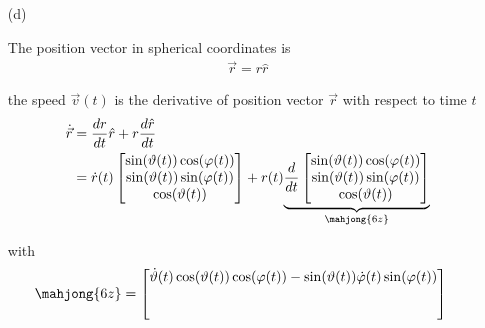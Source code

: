 \documentclass[11pt,a4paper]{article}
\begin{document}
\begin{enumerate}
\item[(d)]

The position vector in spherical coordinates is
\begin{align*}
\vec{r}=r\hat{r}
\end{align*}

the speed $\vec{v}(t)$ is the derivative of position vector $\vec{r}$ with respect to time $t$
\begin{align*}
\dot{\vec{r}}
&=\frac{dr}{dt}\hat{r}+r\frac{d\hat{r}}{dt} \\
&=
\dot{r}(t)
\begin{bmatrix}
\sin(\vartheta(t))\cos(\varphi(t)) \\
\sin(\vartheta(t))\sin(\varphi(t)) \\
\cos(\vartheta(t))
\end{bmatrix}
+
r(t)
\underset{\mahjong{6z}}{\underbrace{
\frac{d}{dt}
\begin{bmatrix}
\sin(\vartheta(t))\cos(\varphi(t)) \\
\sin(\vartheta(t))\sin(\varphi(t)) \\
\cos(\vartheta(t))
\end{bmatrix}
}} \\
\end{align*}

with
\begin{align*}
\mahjong{6z}
&=
\begin{bmatrix}
\dot{\vartheta}(t)\cos(\vartheta(t))\cos(\varphi(t))-\sin(\vartheta(t))\dot{\varphi}(t)\sin(\varphi(t)) \\
\\
\\
\end{bmatrix}
\end{align*}

\end{enumerate}
\end{document}
